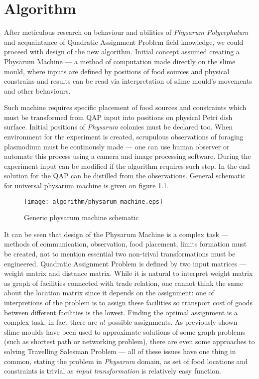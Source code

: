 \chapter{Algorithm}
\label{chapter:algorithm}

After meticulous research on behaviour and abilities of \textit{Physarum Polycephalum} and acquaintance of Quadratic Assignment Problem field knowledge, we could proceed with design of the new algorithm. Initial concept assumed creating a Physarum Machine --- a method of computation made directly on the slime mould, where inputs are defined by positions of food sources and physical constrains and results can be read via interpretation of slime mould's movements and other behaviours.

Such machine requires specific placement of food sources and constraints which must be transformed from QAP input into positions on physical Petri dish surface. Initial positions of \textit{Physarum} colonies must be declared too. When environment for the experiment is created, scrupulous observations of foraging plasmodium must be continously made --- one can use human observer or automate this process using a camera and image processing software. During the experiment input can be modified if the algorithm requires such step. In the end solution for the QAP can be distilled from the observations. General schematic for universal physarum machine is given on figure \ref{figure:a_machine}.

\begin{figure}
  \centering
  \texttt{[image: algorithm/physarum\_machine.eps]}
  \caption{Generic physarum machine schematic}
  \label{figure:a_machine}
\end{figure}

It can be seen that design of the Physarum Machine is a complex task --- methods of communication, observation, food placement, limits formation must be created, not to mention essential two non-trival transformations must be engineered. Quadratic Assignment Problem is defined by two input matrices --- weight matrix and distance matrix. While it is natural to interpret weight matrix as graph of facilities connected with trade relation, one cannot think the same about the location matrix since it depends on the assignment: one of interpretions of the problem is to assign these facilities so transport cost of goods between different facilities is the lowest. Finding the optimal assignment is a complex task, in fact there are $n!$ possible assignments. As previously shown slime moulds have been used to approximate solutions of some graph problems (such as shortest path or networking problem), there are even some approaches to solving Travelling Salesman Problem --- all of these issues have one thing in common, stating the problem in \textit{Physarum} domain, as set of food locations and constraints is trivial as \textit{input transformation} is relatively easy function. 

